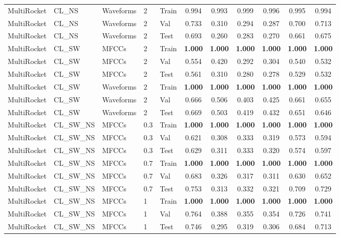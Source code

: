 \begin{landscape}
\begin{longtable}{|l|l|l|l|l|c|c|c|c|c|c|}
MultiRocket & CL\_NS & Waveforms & 2 & Train & 0.994 & 0.993 & 0.999 & 0.996 & 0.995 & 0.994 \\
MultiRocket & CL\_NS & Waveforms & 2 & Val & 0.733 & 0.310 & 0.294 & 0.287 & 0.700 & 0.713 \\
MultiRocket & CL\_NS & Waveforms & 2 & Test & 0.693 & 0.260 & 0.283 & 0.270 & 0.661 & 0.675 \\
MultiRocket & CL\_SW & MFCCs & 2 & Train & \textbf{1.000} & \textbf{1.000} & \textbf{1.000} & \textbf{1.000} & \textbf{1.000} & \textbf{1.000} \\
MultiRocket & CL\_SW & MFCCs & 2 & Val & 0.554 & 0.420 & 0.292 & 0.304 & 0.540 & 0.532 \\
MultiRocket & CL\_SW & MFCCs & 2 & Test & 0.561 & 0.310 & 0.280 & 0.278 & 0.529 & 0.532 \\
MultiRocket & CL\_SW & Waveforms & 2 & Train & \textbf{1.000} & \textbf{1.000} & \textbf{1.000} & \textbf{1.000} & \textbf{1.000} & \textbf{1.000} \\
MultiRocket & CL\_SW & Waveforms & 2 & Val & 0.666 & 0.506 & 0.403 & 0.425 & 0.661 & 0.655 \\
MultiRocket & CL\_SW & Waveforms & 2 & Test & 0.669 & 0.503 & 0.419 & 0.432 & 0.651 & 0.646 \\
MultiRocket & CL\_SW\_NS & MFCCs & 0.3 & Train & \textbf{1.000} & \textbf{1.000} & \textbf{1.000} & \textbf{1.000} & \textbf{1.000} & \textbf{1.000} \\
MultiRocket & CL\_SW\_NS & MFCCs & 0.3 & Val & 0.621 & 0.308 & 0.333 & 0.319 & 0.573 & 0.594 \\
MultiRocket & CL\_SW\_NS & MFCCs & 0.3 & Test & 0.629 & 0.311 & 0.333 & 0.320 & 0.574 & 0.597 \\
MultiRocket & CL\_SW\_NS & MFCCs & 0.7 & Train & \textbf{1.000} & \textbf{1.000} & \textbf{1.000} & \textbf{1.000} & \textbf{1.000} & \textbf{1.000} \\
MultiRocket & CL\_SW\_NS & MFCCs & 0.7 & Val & 0.683 & 0.326 & 0.317 & 0.311 & 0.630 & 0.652 \\
MultiRocket & CL\_SW\_NS & MFCCs & 0.7 & Test & 0.753 & 0.313 & 0.332 & 0.321 & 0.709 & 0.729 \\
MultiRocket & CL\_SW\_NS & MFCCs & 1 & Train & \textbf{1.000} & \textbf{1.000} & \textbf{1.000} & \textbf{1.000} & \textbf{1.000} & \textbf{1.000} \\
MultiRocket & CL\_SW\_NS & MFCCs & 1 & Val & 0.764 & 0.388 & 0.355 & 0.354 & 0.726 & 0.741 \\
MultiRocket & CL\_SW\_NS & MFCCs & 1 & Test & 0.746 & 0.295 & 0.319 & 0.306 & 0.684 & 0.713 \\

\end{longtable}
\end{landscape}
